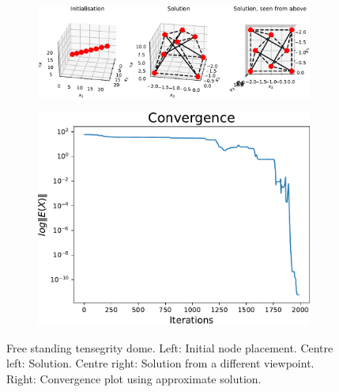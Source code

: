 \begin{figure}[!ht]
\centering
\begin{subfigure}{.72\textwidth}
  \centering
  \includegraphics[width=0.99\linewidth]{Bilder/FREESTANDING.pdf}
\end{subfigure}%
\begin{subfigure}{.3\textwidth}
  \centering
  \includegraphics[width=0.99\linewidth]{Bilder/FREESTANDINGconv.pdf}
\end{subfigure}
\caption{Free standing tensegrity dome. Left:  Initial node placement. Centre left: Solution. Centre right: Solution from a different viewpoint. Right: Convergence plot using approximate solution.}
\label{Freestanding}
\end{figure}

